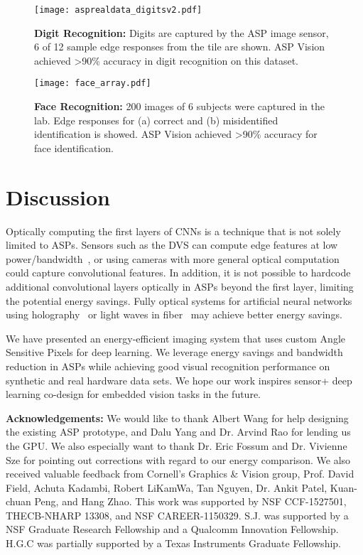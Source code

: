 \documentclass[10pt,twocolumn,letterpaper]{article}
\newcommand{\Section}[1]{\vspace{-4pt}\section{#1}\vspace{-4pt}}
\begin{document}
\begin{figure}[t]
        \begin{center}
        \texttt{[image: asprealdata\_digitsv2.pdf]}
        \end{center}
        \caption{\textbf{Digit Recognition:} Digits are captured by the ASP image sensor, 6 of 12 sample edge responses from the tile are shown. ASP Vision achieved \textgreater 90\% accuracy in digit recognition on this dataset.}
        \label{fig:digit}
    \end{figure}
    
    \begin{figure}[t]
        \begin{center}
		\texttt{[image: face\_array.pdf]} 
        \end{center}
		\caption{\textbf{Face Recognition:} 200 images of 6 subjects were captured in the lab. Edge responses for (a) correct and (b) misidentified identification is showed. ASP Vision achieved \textgreater 90\% accuracy for face identification.}        
		\label{fig:face}
    \end{figure}



\Section{Discussion}
Optically computing the first layers of CNNs is a technique that is not solely limited to ASPs. Sensors such as the DVS can compute edge features at low power/bandwidth~\cite{lichtsteiner2008128}, or using cameras with more general optical computation~\cite{zomet2006lensless} could capture convolutional features. In addition, it is not possible to hardcode additional convolutional layers optically in ASPs beyond the first layer, limiting the potential energy savings. Fully optical systems for artificial neural networks using holography~\cite{farhat1985optical, MIToptical, psaltis1990holography} or light waves in fiber~\cite{hermans2015towards} may achieve better energy savings.

We have presented an energy-efficient imaging system that uses custom Angle Sensitive Pixels for deep learning. We leverage energy savings and bandwidth reduction in ASPs while achieving good visual recognition performance on synthetic and real hardware data sets. We hope our work inspires sensor+ deep learning co-design for embedded vision tasks in the future.

\vspace{5mm}
\noindent \textbf{Acknowledgements:} We would like to thank Albert Wang for help designing the existing ASP prototype, and Dalu Yang and Dr. Arvind Rao for lending us the GPU. We also especially want to thank Dr. Eric Fossum and Dr. Vivienne Sze for pointing out corrections with regard to our energy comparison. We also received valuable feedback from Cornell's Graphics \& Vision group, Prof. David Field, Achuta Kadambi, Robert LiKamWa, Tan Nguyen, Dr. Ankit Patel, Kuan-chuan Peng, and Hang Zhao. This work was supported by NSF CCF-1527501, THECB-NHARP 13308, and NSF CAREER-1150329. S.J. was supported by a NSF Graduate Research Fellowship and a Qualcomm Innovation Fellowship. H.G.C was partially supported by a Texas Instruments Graduate Fellowship.   



{\small


}
\end{document}
